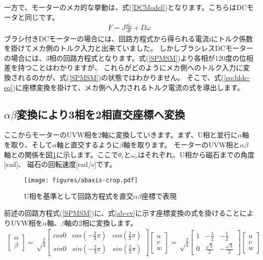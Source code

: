 一方で、モーターのメカ的な挙動は、式(\ref{DCModel})となります。こちらはDCモータと同じです。
{\large
\begin{align}
F=J\frac{d\omega}{dt} + D\omega \label{DCModel}
\end{align}
}
ブラシ付きDCモーターの場合には、回路方程式から得られる電流iにトルク係数を掛けてメカ側のトルク入力と出来ていました。
しかしブラシレスDCモーターの場合には、3相の回路方程式となります。式(\ref{SPMSM})より各相が120度の位相差を持つことはわかりますが、
これらがどのようにメカ側へのトルク入力に変換されるのかが、式(\ref{SPMSM})の状態ではわかりません。
そこで、式(\ref{eq:bldc-eq})に座標変換を掛けて、メカ側へ入力されるトルク電流の式を導出します。
\subsection{$\alpha\beta$変換により3相を2相直交座標へ変換}
ここからモーターのUVW相を2軸に変換していきます。まず、U相と並行に$\alpha$軸を取り、そして$\alpha$軸と直交するように$\beta$軸を取ります。
モーターのUVW相と$\alpha\beta$軸との関係を図\ref{abaxis}に示します。ここで$\theta_{r}と\omega_{r}$はそれぞれ、U相から磁石までの角度[rad]、
磁石の回転速度[rad/s]です。
\begin{figure}[htbp!]
    \begin{center}
        \texttt{[image: figures/abaxis-crop.pdf]}
    \end{center}
    \caption{U相を基準として回路方程式を直交$αβ$座標で表現}
    \label{abaxis}
\end{figure}
前述の回路方程式(\ref{SPMSM})に、式\ref{ab-cv}に示す座標変換の式を掛けることによりUVW相を$\alpha$軸、$\beta$軸の2相に変換します。
{\large
\begin{align}
    \begin{bmatrix}
        \alpha \\
        \beta
    \end{bmatrix}
    = \sqrt\frac{2}{3}
    \begin{bmatrix}
        cos0 & cos(-\frac{2}{3} \pi) & cos(\frac{2}{3} \pi) \\
        sin0 & sin(-\frac{2}{3} \pi) & sin(\frac{2}{3} \pi)
    \end{bmatrix}
    \begin{bmatrix}
        u \\
        v \\
        w
    \end{bmatrix}
    = \sqrt\frac{2}{3}
    \begin{bmatrix}
        1 & -\frac{1}{2} & -\frac{1}{2} \\
        0 & \frac{\sqrt{3}}{2} & -\frac{\sqrt{3}}{2}
    \end{bmatrix}
    \begin{bmatrix}
        u \\
        v \\
        w
    \end{bmatrix}
    \label{ab-cv}
\end{align}
}
